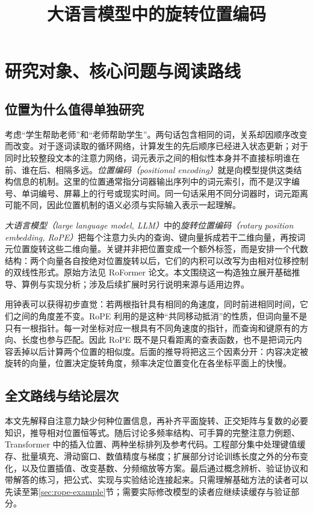 \documentclass[UTF8,12pt,a4paper,fontset=fandol]{ctexart}
\title{大语言模型中的旋转位置编码}
\author{}
\date{}
\begin{document}
\maketitle
\tableofcontents

\section{研究对象、核心问题与阅读路线}
\label{sec:rope-intro}

\subsection{位置为什么值得单独研究}
考虑“学生帮助老师”和“老师帮助学生”。两句话包含相同的词，关系却因顺序改变而改变。对于逐词读取的循环网络，计算发生的先后顺序已经进入状态更新；对于同时比较整段文本的注意力网络，词元表示之间的相似性本身并不直接标明谁在前、谁在后、相隔多远。\emph{位置编码（positional encoding）}就是向模型提供这类结构信息的机制。这里的位置通常指分词器输出序列中的词元索引，而不是汉字编号、单词编号、屏幕上的行号或现实时间。同一句话采用不同分词器时，词元距离可能不同，因此位置机制的语义必须与实际输入表示一起理解。

\emph{大语言模型（large language model, LLM）}中的\emph{旋转位置编码（rotary position embedding, RoPE）}把每个注意力头内的查询、键向量拆成若干二维向量，再按词元位置旋转这些二维向量。关键并非把位置变成一个额外标签，而是安排一个代数结构：两个向量各自按绝对位置旋转以后，它们的内积可以改写为由相对位移控制的双线性形式。原始方法见 RoFormer 论文\cite{su2021}。本文围绕这一构造独立展开基础推导、算例与实现分析；涉及后续扩展时另行说明来源与适用边界。

用钟表可以获得初步直觉：若两根指针具有相同的角速度，同时前进相同时间，它们之间的角度差不变。RoPE 利用的是这种“共同移动抵消”的性质，但词向量不是只有一根指针。每一对坐标对应一根具有不同角速度的指针，而查询和键原有的方向、长度也参与匹配。因此 RoPE 既不是只看距离的查表函数，也不是把词元内容丢掉以后计算两个位置的相似度。后面的推导将把这三个因素分开：内容决定被旋转的向量，位置决定旋转角度，频率决定位置变化在各坐标平面上的快慢。

\subsection{全文路线与结论层次}
本文先解释自注意力缺少何种位置信息，再补齐平面旋转、正交矩阵与复数的必要知识，推导相对位置恒等式。随后讨论多频率结构、可手算的完整注意力例题、Transformer 中的插入位置、两种坐标排列及参考代码。工程部分集中处理键值缓存、批量填充、滑动窗口、数值精度与梯度；扩展部分讨论训练长度之外的分布变化，以及位置插值、改变基数、分频缩放等方案。最后通过概念辨析、验证协议和带解答的练习，把公式、实现与实验结论连接起来。只需理解基础方法的读者可以先读至第\ref{sec:rope-example}节；需要实际修改模型的读者应继续读缓存与验证部分。
\end{document}
